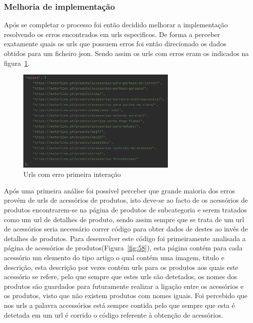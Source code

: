 \subsubsection{Melhoria de implementação}

Após se completar o processo foi então decidido melhorar a implementação resolvendo os erros encontrados em urls especificos. De forma a perceber exatamente quais os urls
que possuem erros foi então direcionado os dados obtidos para um ficheiro json. Sendo assim os urls com erros eram os indicados na figura~\ref{fig:57}.

\begin{figure}[htb]
    \centering
    
    \includegraphics[width=0.7\textwidth]{images/implementacao/scraper/urls_erro_iteracao_1.png}
    \caption{Urls com erro primeira interação}
    \label{fig:57}
\end{figure}

Após uma primeira análise foi possível perceber que grande maioria dos erros provém de urls de acessórios de produtos, isto deve-se ao facto de os acessórios de produtos encontrarem-se
na página de produtos de subcategoria e serem tratados como um url de detalhes de produto, sendo assim sempre que se trata de um url de acessórios seria necessário correr código para 
obter dados de destes ao invés de detalhes de produtos. Para desenvolver este código foi primeiramente analisada a página de acessórios de produtos(Figura~\ref*{fig:58}), 
esta página contém para cada acessório um elemento do tipo artigo o qual contém uma imagem, titulo e descrição, esta descrição por vezes contém urls para os produtos aos quais este acessório se refere, pelo que sempre que estes
urls são detetados, os nomes dos produtos são guardados para futuramente realizar a ligação entre os acessórios e os produtos, visto que não existem produtos com nomes iguais. Foi percebido que nos urls a palavra accessórios está 
sempre contida pelo que sempre que esta é detetada em um url é corrido o código referente à obtenção de acessórios.

